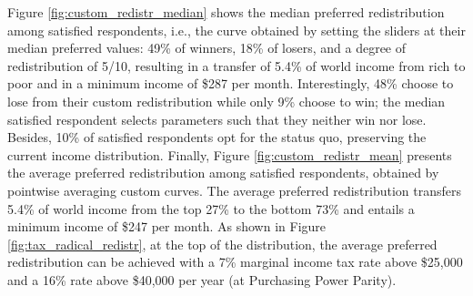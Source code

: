 \documentclass[12pt,english]{article}
\begin{document}


Figure \ref{fig:custom_redistr_median} shows the median preferred redistribution among satisfied respondents, i.e., the curve obtained by setting the sliders at their median preferred values: 49\% of winners, 18\% of losers, and a degree of redistribution of 5/10, resulting in a transfer of 5.4\% of world income from rich to poor and in a minimum income of \$287 per month. 
Interestingly, 48\% choose to lose from their custom redistribution while only 9\% choose to win; the median satisfied respondent selects parameters such that they neither win nor lose. Besides, 10\% of satisfied respondents opt for the status quo, preserving the current income distribution. 
Finally, Figure \ref{fig:custom_redistr_mean} presents the average preferred redistribution among satisfied respondents, obtained by pointwise averaging custom curves. 
The average preferred redistribution transfers 5.4\% of world income from the top 27\% to the bottom 73\% and entails a minimum income of \$247 per month.  
As shown in Figure \ref{fig:tax_radical_redistr}, at the top of the distribution, the average preferred redistribution can be achieved with a 7\% marginal income tax rate above \$25,000 and a 16\% rate above \$40,000 per year (at Purchasing Power Parity). 
\end{document}

